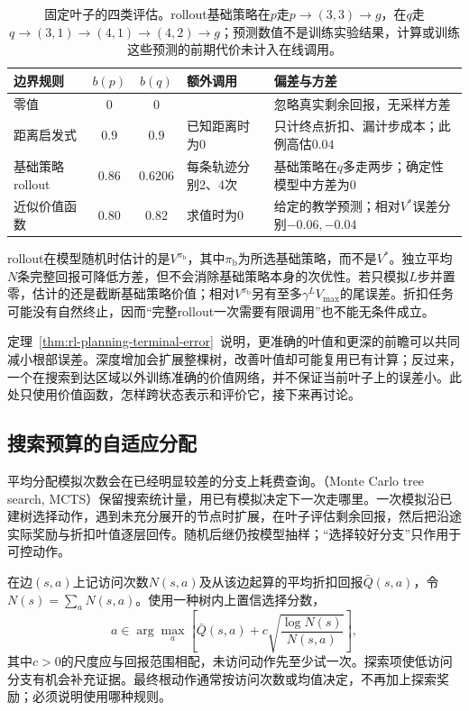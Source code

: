 \begin{table}[htbp]
 \centering
 \small
 \begin{tabularx}{\linewidth}{@{}lcc>{\raggedright\arraybackslash}X>{\raggedright\arraybackslash}X@{}}
  \toprule
  边界规则 & $b(p)$ & $b(q)$ & 额外调用 & 偏差与方差\\
  \midrule
  零值 & $0$ & $0$ & 0 & 忽略真实剩余回报，无采样方差\\
  距离启发式 & $0.9$ & $0.9$ & 已知距离时为0 & 只计终点折扣、漏计步成本；此例高估$0.04$\\
  基础策略rollout & $0.86$ & $0.6206$ & 每条轨迹分别2、4次 & 基础策略在$q$多走两步；确定性模型中方差为0\\
  近似价值函数 & $0.80$ & $0.82$ & 求值时为0 & 给定的教学预测；相对$V^*$误差分别$-0.06,-0.04$\\
  \bottomrule
 \end{tabularx}
 \caption{固定叶子的四类评估。rollout基础策略在$p$走$p\to(3,3)\to g$，在$q$走$q\to(3,1)\to(4,1)\to(4,2)\to g$；预测数值不是训练实验结果，计算或训练这些预测的前期代价未计入在线调用。}
 \label{tab:rl-planning-leaf-values}
\end{table}

rollout在模型随机时估计的是$V^{\pi_{\mathrm b}}$，其中$\pi_{\mathrm b}$为所选基础策略，而不是$V^*$。独立平均$N$条完整回报可降低方差，但不会消除基础策略本身的次优性。若只模拟$L$步并置零，估计的还是截断基础策略价值；相对$V^{\pi_{\mathrm b}}$另有至多$\gamma^L V_{\max}$的尾误差。折扣任务可能没有自然终止，因而“完整rollout一次需要有限调用”也不能无条件成立。

定理~\ref{thm:rl-planning-terminal-error}~说明，更准确的叶值和更深的前瞻可以共同减小根部误差。深度增加会扩展整棵树，改善叶值却可能复用已有计算；反过来，一个在搜索到达区域以外训练准确的价值网络，并不保证当前叶子上的误差小。此处只使用价值函数，怎样跨状态表示和评价它，接下来再讨论。

\subsection{搜索预算的自适应分配}
\label{sec:rl-planning-mcts}

平均分配模拟次数会在已经明显较差的分支上耗费查询。（Monte Carlo tree search, MCTS）保留搜索统计量，用已有模拟决定下一次走哪里。一次模拟沿已建树选择动作，遇到未充分展开的节点时扩展，在叶子评估剩余回报，然后把沿途实际奖励与折扣叶值逐层回传。随机后继仍按模型抽样；“选择较好分支”只作用于可控动作。

在边$(s,a)$上记访问次数$N(s,a)$及从该边起算的平均折扣回报$\bar Q(s,a)$，令$N(s)=\sum_aN(s,a)$。使用一种树内上置信选择分数，
\begin{equation}
 a\in\arg\max_a\left[
 \bar Q(s,a)+c\sqrt{\frac{\log N(s)}{N(s,a)}}\right],
 \label{eq:rl-planning-uct}
\end{equation}
其中$c>0$的尺度应与回报范围相配，未访问动作先至少试一次。探索项使低访问分支有机会补充证据。最终根动作通常按访问次数或均值决定，不再加上探索奖励；必须说明使用哪种规则。

